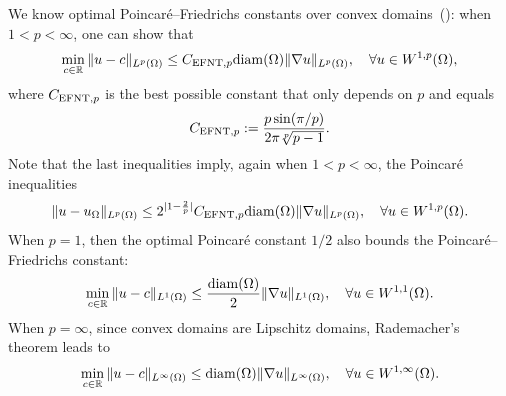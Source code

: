 \documentclass[12pt,a4paper]{article}
\begin{document}
We know optimal Poincar\'e--Friedrichs constants over convex domains~(\cite[Theorem~1.1]{ferone2012remark}\cite[Theorem~1.1]{esposito2013poincare}): 
when $1 < p < \infty$, one can show that 
\begin{align}\label{math:esposito:pf}
    \min\limits_{ c \in {\mathbb R} }
    \| u - c \|_{L^{p}(\Omega)}
    \leq 
    C_{{\rm EFNT},p}
    {\operatorname{diam}}(\Omega)
    \| \nabla u \|_{L^{p}(\Omega)}
    ,
    \quad 
    \forall 
    u \in W^{1,p}(\Omega)
    ,
\end{align}
where $C_{{\rm EFNT},p}$ is the best possible constant that only depends on $p$ and equals 
\begin{align}
    C_{{\rm EFNT},p}
    :=
    \frac{ p \sin(\pi/p) }{ 2\pi \sqrt[p]{p-1} }
    .
\end{align}
Note that the last inequalities imply, again when $1 < p < \infty$, the Poincar\'e inequalities
\begin{align}\label{math:esposito:poincare}
    \| u - u_{\Omega} \|_{L^{p}(\Omega)}
    \leq 
    2^{|1-\frac 2 p|}C_{{\rm EFNT},p}
    {\operatorname{diam}}(\Omega)
    \| \nabla u \|_{L^{p}(\Omega)}
    ,
    \quad 
    \forall 
    u \in W^{1,p}(\Omega)
    .
\end{align}
When $p=1$, then the optimal Poincar\'e constant $1/2$ also bounds the Poincar\'e--Friedrichs constant:
\begin{align}\label{math:l1estimate}
    \min\limits_{ c \in {\mathbb R} }
    \| u - c \|_{L^{1}(\Omega)}
    \leq 
    \frac{ {\operatorname{diam}}(\Omega) }{2}
    \| \nabla u \|_{L^{1}(\Omega)}
    ,
    \quad 
    \forall 
    u \in W^{1,1}(\Omega)
    .
\end{align}
When $p=\infty$, since convex domains are Lipschitz domains, Rademacher's theorem leads to 
\begin{align}\label{math:lipschitzestimate}
    \min\limits_{ c \in {\mathbb R} }
    \| u - c \|_{L^{\infty}(\Omega)}
    \leq 
    {\operatorname{diam}}(\Omega)
    \| \nabla u \|_{L^{\infty}(\Omega)}
    ,
    \quad 
    \forall 
    u \in W^{1,\infty}(\Omega)
    .
\end{align}

\end{document}
